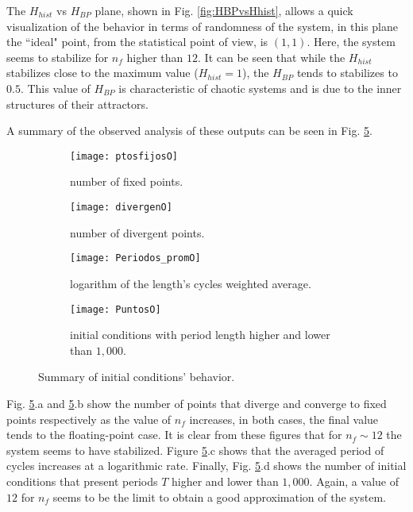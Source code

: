 The $H_{hist}$ vs $H_{BP}$ plane, shown in Fig. \ref{fig:HBPvsHhist}, allows a quick visualization of the behavior in terms of randomness of the system, in this plane the ``ideal" point, from the statistical point of view, is $(1,1)$.
Here, the system seems to stabilize for $n_f$ higher than $12$.
It can be seen that while the $H_{hist}$ stabilizes close to the maximum value ($H_{hist}=1$), the $H_{BP}$ tends to stabilizes to $0.5$.
This value of $H_{BP}$ is characteristic of chaotic systems and is due to the inner structures of their attractors.

A summary of the observed analysis of these outputs can be seen in Fig. \ref{puntos}.
%
\begin{figure}
    \centering
    \begin{subfigure}[b]{0.49\textwidth}
        \texttt{[image: ptosfijosO]}
        \caption{number of fixed points.}
        \label{fig:gull}
    \end{subfigure}
    \hfill 
    \begin{subfigure}[b]{0.49\textwidth}
        \texttt{[image: divergenO]}
        \caption{number of divergent points.}
        \label{fig:tiger}
    \end{subfigure}
   \hfill 
    \begin{subfigure}[b]{0.49\textwidth}
        \texttt{[image: Periodos\_promO]}
        \caption{logarithm of the length's cycles weighted average.}
        \label{fig:mouse}
    \end{subfigure}
  \hfill   
    \begin{subfigure}[b]{0.49\textwidth}
        \texttt{[image: PuntosO]}
        \caption{initial conditions with period length higher and lower than $1,000$.}
        \label{fig:mouse}
    \end{subfigure}
    \caption{Summary of initial conditions' behavior.}\label{puntos}
\end{figure}


Fig. \ref{puntos}.a and \ref{puntos}.b show the number of points that diverge and converge to fixed points respectively as the value of $n_f$ increases, in both cases, the final value tends to the floating-point case.
It is clear from these figures that for $n_f \sim 12$ the system seems to have stabilized.
Figure \ref{puntos}.c shows that the averaged period of cycles increases at a logarithmic rate.
Finally, Fig. \ref{puntos}.d shows the number of initial conditions that present periods $T$ higher and lower than $1,000$.
Again, a value of $12$ for $n_f$ seems to be the limit to obtain a good approximation of the system.

